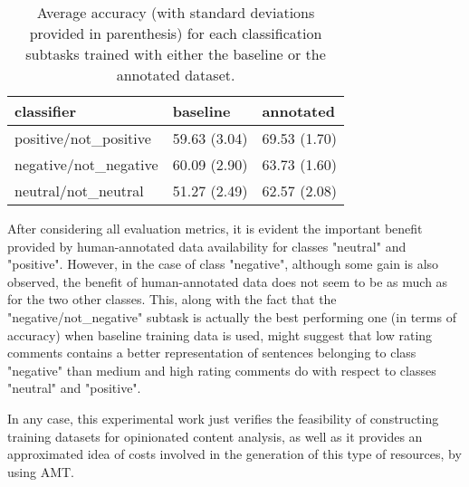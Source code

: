 \begin{table}
\begin{tabular}{|l|l|l|}
\hline
classifier &baseline &annotated \\ 
\hline
positive/not\_positive &59.63 (3.04) &69.53 (1.70) \\ 
\hline
negative/not\_negative &60.09 (2.90) &63.73 (1.60) \\ 
\hline
neutral/not\_neutral &51.27 (2.49) &62.57 (2.08) \\ 
\hline
\end{tabular}
\caption{Average accuracy (with standard deviations provided in parenthesis) 
for each classification subtasks trained with either the baseline or the annotated dataset.}
\label{tc_accu}
\end{table}

After considering all evaluation metrics, it is evident the important benefit provided by human-annotated data 
availability for classes "neutral" and "positive". However, in the case of class "negative", although some 
gain is also observed, the benefit of human-annotated data does not seem to be as much as for the two other 
classes. This, along with the fact that the "negative/not\_negative" subtask is actually the best performing
one (in terms of accuracy) when baseline training data is used, might suggest that low rating comments contains 
a better representation of sentences belonging to class "negative" than medium and high rating comments do with
respect to classes "neutral" and "positive". 

In any case, this experimental work just verifies the feasibility of constructing training datasets for
opinionated content analysis, as well as it provides an approximated idea of costs involved in the generation
of this type of resources, by using AMT.


